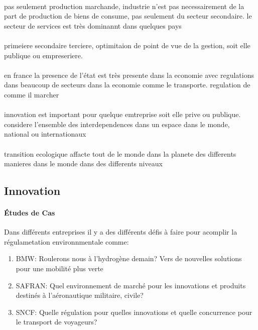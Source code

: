 \documentclass{article}
\begin{document}
\paragraph{}pas seulement production marchande, industrie n'est pas necessairement de la part de production de biens de consume, pas seulement du secteur secondaire. le secteur de services est très dominannt dans quelques pays

\paragraph{}primeiere secondaire terciere, optimitaion de point de vue de la gestion, soit elle publique ou empreseriere.

\paragraph{}en france la presence de l'état est très presente dans la economie avec regulations dans beaucoup de secteurs dans la economie comme le transporte. regulation de comme il marcher

\paragraph{}innovation est important pour quelque emtreprise soit elle prive ou publique. considere l'ensemble des interdependences dans un espace dans le monde, national ou internationaux 

\paragraph{}transition ecologique affacte tout de le monde dans la planete des differents manieres dans le monde dans des differents niveaux


\subsection{Innovation}
\paragraph{Études de Cas}Dans différents entreprises il y a des différents défis à faire pour acomplir la régulametation environnmentale comme:
\begin{enumerate}
    \item BMW: Roulerons nous à l'hydrogène demain? Vers de nouvelles solutions pour une mobilité plus verte
    \item SAFRAN: Quel environnement de marché pour les innovations et produits destinés à l'aéronautique militaire, civile?
    \item SNCF: Quelle régulation pour quelles innovations et quelle concurrence pour le transport de voyageurs?
\end{enumerate}
\end{document}
